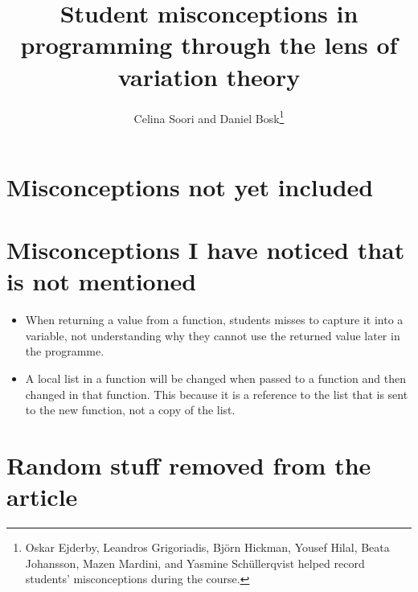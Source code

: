 \documentclass[onecolumn]{article}
\title{Student misconceptions in programming through the lens of variation 
theory}
\author{%
  Celina Soori and
  Daniel Bosk\thanks{%
    Oskar Ejderby,
    Leandros Grigoriadis,
    Björn Hickman,
    Yousef Hilal,
    Beata Johansson,
    Mazen Mardini, and
    Yasmine Schüllerqvist
    helped record students' misconceptions during the course.
  }%
}
\begin{document}

\maketitle
\begin{abstract}
  
\end{abstract}

\clearpage
\tableofcontents
\clearpage















\printbibliography

\appendix

\section{Misconceptions not yet included}




\section{Misconceptions I have noticed that is not mentioned}

\begin{itemize}
    \item When returning a value from a function, students misses to 
capture it into a variable, not understanding why they cannot use the 
returned value later in the programme. 
    \item A local list in a function will be changed when passed to a 
function and then changed in that function. This because it is a 
reference to the list that is sent to the new function, not a copy of 
the list. 
\end{itemize}

\section{Random stuff removed from the article}
\end{document}
